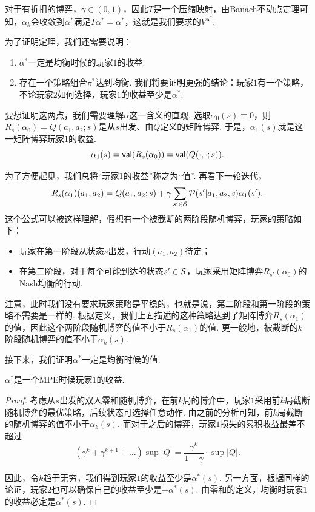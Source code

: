 对于有折扣的博弈，$\gamma\in (0,1)$，因此$T$是一个压缩映射，由Banach不动点定理可知，$\alpha_k$会收敛到$\alpha^*$满足$T\alpha^*=\alpha^*$，这就是我们要求的$V^{\boldsymbol \pi^*}$.

为了证明定理，我们还需要说明：
\begin{enumerate}
    \item $\alpha^*$一定是均衡时候的玩家$1$的收益.
    \item 存在一个策略组合$\pi^*$达到均衡. 我们将要证明更强的结论：玩家$1$有一个策略，不论玩家$2$如何选择，玩家$1$的收益至少是$\alpha^*$.
\end{enumerate}

要想证明这两点，我们需要理解$\alpha$这一含义的直观. 选取$\alpha_0(s)\equiv 0$，则$R_s(\alpha_0)=Q(a_1,a_2;s)$是从$s$出发、由$Q$定义的矩阵博弈. 于是，$\alpha_1(s)$就是这一矩阵博弈玩家$1$的收益. 
    \[\alpha_1(s)=\mathsf{val}(R_s(\alpha_0))=\mathsf{val}(Q(\cdot,\cdot;s)).\]

为了方便起见，我们总将“玩家$1$的收益”称之为“值”. 再看下一轮迭代，
\[R_s(\alpha_1)(a_1,a_2)=Q(a_1,a_2;s)+\gamma\sum_{s'\in \mathcal S}\mathcal P(s'|a_1,a_2,s)\alpha_1(s').\]
这个公式可以被这样理解，假想有一个被截断的两阶段随机博弈，玩家的策略如下：
    \begin{itemize}
        \item 玩家在第一阶段从状态$s$出发，行动$(a_1,a_2)$待定；
        \item 在第二阶段，对于每个可能到达的状态$s'\in \mathcal S$，玩家采用矩阵博弈$R_{s'}(\alpha_0)$的Nash均衡的行动.
    \end{itemize}

注意，此时我们没有要求玩家策略是平稳的，也就是说，第二阶段和第一阶段的策略不需要是一样的. 根据定义，我们上面描述的这种策略达到了矩阵博弈$R_s(\alpha_1)$的值，因此这个两阶段随机博弈的值不小于$R_s(\alpha_1)$的值. 更一般地，被截断的$k$阶段随机博弈的值不小于$\alpha_{k}(s)$. 

接下来，我们证明$\alpha^*$一定是均衡时候的值. 

\begin{lemma}
    $\alpha^*$是一个MPE时候玩家$1$的收益. 
\end{lemma}
\begin{proof}
考虑从$s$出发的双人零和随机博弈，在前$k$局的博弈中，玩家$1$采用前$k$局截断随机博弈的最优策略，后续状态可选择任意动作. 由之前的分析可知，前$k$局截断的随机博弈的值不小于$\alpha_k(s)$. 而对于之后的博弈，玩家$1$损失的累积收益最差不超过
\[(\gamma^k+\gamma^{k+1}+\dots)\sup|Q|=\frac{\gamma^k}{1-\gamma}\cdot \sup|Q|.\]

因此，令$k$趋于无穷，我们得到玩家$1$的收益至少是$\alpha^*(s)$. 另一方面，根据同样的论证，玩家$2$也可以确保自己的收益至少是$-\alpha^*(s)$. 由零和的定义，均衡时玩家$1$的收益必定是$\alpha^*(s)$. 
\end{proof}

